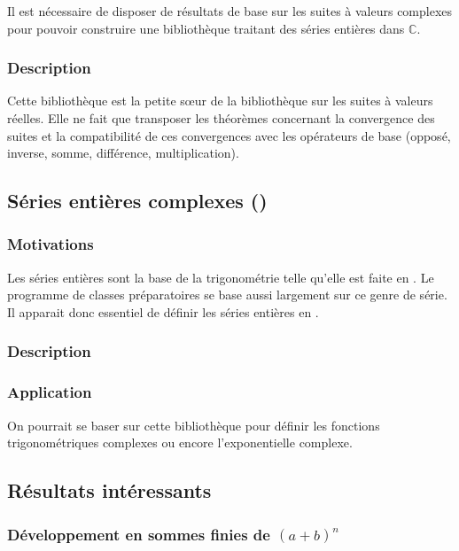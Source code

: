 Il est nécessaire de disposer de résultats de base sur les suites à valeurs complexes pour pouvoir construire une bibliothèque traitant des séries entières dans $\mathbb{C}$.

\subsubsection{Description}

Cette bibliothèque est la petite s\oe{}ur de la bibliothèque sur les suites à valeurs réelles. Elle ne fait que transposer les théorèmes concernant la convergence des suites et la compatibilité de ces convergences avec les opérateurs de base (opposé, inverse, somme, différence, multiplication).

\subsection{Séries entières complexes ()}

\subsubsection{Motivations}

Les séries entières sont la base de la trigonométrie telle qu'elle est faite en \coq. Le programme de classes préparatoires se base aussi largement sur ce genre de série. Il apparait donc essentiel de définir les séries entières en \coq.

\subsubsection{Description}



\subsubsection{Application}

On pourrait se baser sur cette bibliothèque pour définir les fonctions trigonométriques complexes ou encore l'exponentielle complexe.

\subsection{Résultats intéressants}

\subsubsection{D\'eveloppement en sommes finies de $(a + b) ^ n$}

